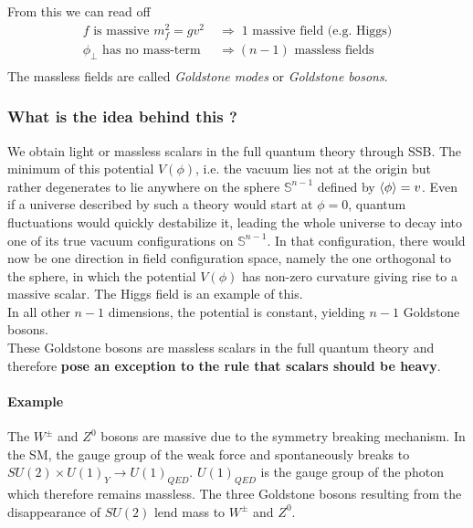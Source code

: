 From this we can read off
\begin{equation*}
	\begin{array}{ll}
		f \text{ is massive }m^2_f=g v^2 \; &\Rightarrow \; 1 \text{ massive field (e.g. Higgs)}\\
		\phi_\perp \text{ has no mass-term } &\Rightarrow (n-1) \text{ massless fields}\\
	\end{array}
\end{equation*}
The massless fields are called \emph{Goldstone modes} or \emph{Goldstone bosons}.
\subsubsection{What is the idea behind this ?}
We obtain light or massless scalars in the full quantum theory through SSB. The minimum of this potential $V(\phi)$, i.e. the vacuum lies not at the origin but rather degenerates to lie anywhere on the sphere $\mathbb{S}^{n-1}$ defined by $\expval{\phi}=v$. Even if a universe described by such a theory would start at $\phi=0$, quantum fluctuations would quickly destabilize it, leading the whole universe to decay into one of its true  vacuum configurations on $\mathbb{S}^{n-1}$. In that configuration, there would now be one direction in field configuration space, namely the one orthogonal to the sphere, in which the potential $V(\phi)$ has non-zero curvature giving rise to a massive scalar. The Higgs field is an example of this.\\
In all other $n-1$ dimensions, the potential is constant, yielding $n-1$ Goldstone bosons.\\
These Goldstone bosons are massless scalars in the full quantum theory and therefore \textbf{pose an exception to the rule that scalars should be heavy}.
 \paragraph{Example}
The $W^{\pm}$ and $Z^0$ bosons are massive due to the symmetry breaking mechanism. In the SM, the gauge group of the weak force and spontaneously breaks to $SU(2)\times U(1)_Y$$\rightarrow U(1)_{QED}$. $U(1)_{QED}$ is the gauge group of the photon which therefore remains massless. The three Goldstone bosons resulting from the disappearance of $SU(2)$ lend mass to $W^{\pm}$ and $Z^0$.

